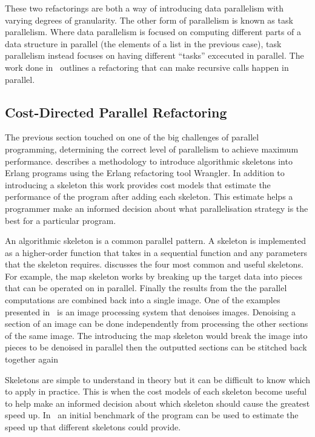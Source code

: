These two refactorings are both a way of introducing data parallelism with varying degrees of granularity. The other form of parallelism is known as task parallelism. Where data parallelism is focused on computing different parts of a data structure in parallel (the elements of a list in the previous case), task parallelism instead focuses on having different ``tasks'' excecuted in parallel. The work done in~\cite{paraforming} outlines a refactoring that can make recursive calls happen in parallel.

\subsection{Cost-Directed Parallel Refactoring}

The previous section touched on one of the big challenges of parallel programming, determining the correct level of parallelism to achieve maximum performance. \cite{parallelErl} describes a methodology to introduce algorithmic skeletons into Erlang programs using the Erlang refactoring tool Wrangler. In addition to introducing a skeleton this work provides cost models that estimate the performance of the program after adding each skeleton. This estimate helps a programmer make an informed decision about what parallelisation strategy is the best for a particular program. 

An algorithmic skeleton is a common parallel pattern. A skeleton is implemented as a higher-order function that takes in a sequential function and any parameters that the skeleton requires. \cite{parallelErl} discusses the four most common and useful skeletons. For example, the map skeleton works by breaking up the target data into pieces that can be operated on in parallel. Finally the results from the the parallel computations are combined back into a single image. One of the examples presented in~\cite{parallelErl} is an image processing system that denoises images. Denoising a section of an image can be done independently from processing the other sections of the same image. The introducing the map skeleton would break the image into pieces to be denoised in parallel then the outputted sections can be stitched back together again

Skeletons are simple to understand in theory but it can be difficult to know which to apply in practice. This is when the cost models of each skeleton become useful to help make an informed decision about which skeleton should cause the greatest speed up. In~\cite{parallelErl} an initial benchmark of the program can 
be used to estimate the speed up that different skeletons could provide.

